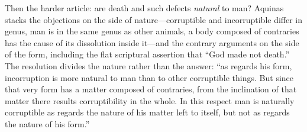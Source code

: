 Then the harder article: are death and such defects \emph{natural} to man? Aquinas stacks the objections on the side of nature---corruptible and incorruptible differ in genus, man is in the same genus as other animals, a body composed of contraries has the cause of its dissolution inside it---and the contrary arguments on the side of the form, including the flat scriptural assertion that ``God made not death.'' The resolution divides the nature rather than the answer: ``as regards his form, incorruption is more natural to man than to other corruptible things. But since that very form has a matter composed of contraries, from the inclination of that matter there results corruptibility in the whole. In this respect man is naturally corruptible as regards the nature of his matter left to itself, but not as regards the nature of his form.''

